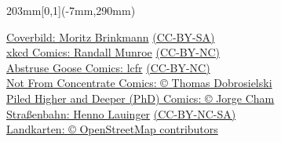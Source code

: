 {    \begin{textblock*}{203mm}[0,1](-7mm,290mm)
        \begin{flushright}
            \footnotesize
            \href{http://mobrinkmann.de}{Coverbild: Moritz Brinkmann} \href{http://creativecommons.org/licenses/by-sa/4.0/}{(CC-BY-SA)}\\ %
            \href{http://xkcd.com/}{xkcd Comics: Randall Munroe} \href{http://creativecommons.org/licenses/by-nc/2.5/}{(CC-BY-NC)}\\
            \href{http://abstrusegoose.com/}{Abstruse Goose Comics: lcfr} \href{http://creativecommons.org/licenses/by-nc/3.0/us/}{(CC-BY-NC)}\\
            \href{http://nfccomic.com/index.php}{Not From Concentrate Comics: \copyright{} Thomas Dobrosielski}\\
            \href{http://www.phdcomics.com/}{Piled Higher and Deeper (PhD) Comics: \copyright{} Jorge Cham}\\
            \href{http://mbah.deviantart.com/art/Evil-Tram-126691939}{Straßenbahn: Henno Lauinger} \href{http://creativecommons.org/licenses/by-nc-sa/3.0/}{(CC-BY-NC-SA)}\\
			\href{http://www.openstreetmap.org/}{Landkarten: \copyright{} OpenStreetMap contributors} 
        \end{flushright}
    \end{textblock*}
}

\graphicspath{{./bilder/}{./}}

\newcommand{\dschungel}{
    \marginpar{
        \centering
        \hyperref[dschungel] {
            \texttt{[image: dschungelbuch\_3.pdf]}
        }
    }
}
